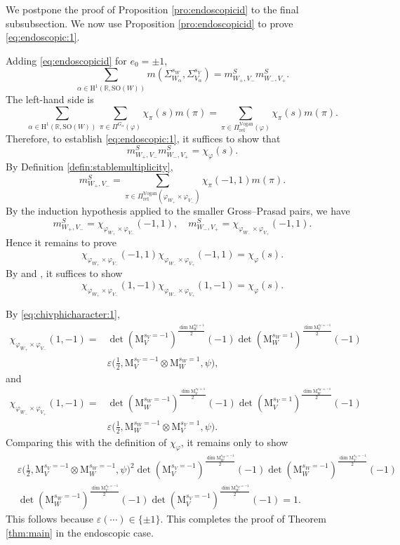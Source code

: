 \documentclass[12pt]{amsart}
\numberwithin{equation}{subsection}
\newcommand{\BR}{{\mathbb {R}}}
\newcommand{\RH}{{\mathrm {H}}}
\newcommand{\RM}{{\mathrm {M}}}
\newcommand{\SO}{{\mathrm{SO}}}
\def\alp{{\alpha}}
\def\veps{{\varepsilon}}
\def\Sig{{\Sigma}}
\def\vphi{\varphi}
\def\Vg{\mathrm{Vogan}}
\def\rel{\mathrm{rel}}
\def\SO{\mathrm{SO}}
\begin{document}
We postpone the proof of Proposition \ref{pro:endoscopicid} to the final subsubsection. We now use Proposition \ref{pro:endoscopicid} to prove \eqref{eq:endoscopic:1}.

Adding \eqref{eq:endoscopicid} for $e_0=\pm 1$,
\[
\sum_{\alp\in \RH^1(\BR,\SO(W))}
m(\Sig^{s_W}_{W_\alp},\Sig^{s_V}_{V_\alp}) =
m^S_{W_+,V_-} m^S_{W_-,V_+}.
\]
The left-hand side is
\[
\sum_{\alp\in \RH^1(\BR,\SO(W))}
\sum_{\pi\in \Pi^{G_\alp}(\vphi)}
\chi_\pi(s) m(\pi)
=
\sum_{\pi\in \Pi^\Vg_\rel(\vphi)}
\chi_\pi(s) m(\pi).
\]
Therefore, to establish \eqref{eq:endoscopic:1}, it suffices to show that
\[
m^S_{W_+,V_-} m^S_{W_-,V_+} =
\chi_\vphi(s).
\]
By Definition \ref{defin:stablemultiplicity},
\[
m^S_{W_+,V_-}
=
\sum_{\pi\in \Pi^\Vg_{\rel}(\vphi_{W_+}\times \vphi_{V_-})}
\chi_\pi(-1,1) m(\pi).
\]
By the induction hypothesis applied to the smaller Gross--Prasad pairs, we have
\[
m^S_{W_+,V_-} =
\chi_{\vphi_{W_+}\times \vphi_{V_-}}(-1,1),
\quad
m^S_{W_-,V_+} =
\chi_{\vphi_{W_-}\times \vphi_{V_+}}(-1,1).
\]
Hence it remains to prove
\[
\chi_{\vphi_{W_+}\times \vphi_{V_-}}(-1,1)
\chi_{\vphi_{W_-}\times \vphi_{V_+}}(-1,1)
=
\chi_\vphi(s).
\]
By \cite[(10.4)]{MR1186476} and \cite[Prop.~10.5]{MR1186476}, it suffices to show
\[
\chi_{\vphi_{W_+}\times \vphi_{V_-}}(1,-1)
\chi_{\vphi_{W_-}\times \vphi_{V_+}}(1,-1)
=
\chi_\vphi(s).
\]

By \eqref{eq:chivphicharacter:1},
\begin{align*}
\chi_{\vphi_{W_+}\times \vphi_{V_-}}(1,-1)
= &
\det
({\RM^{s_V=-1}_V})^{\frac{\dim \RM_{W}^{s_W = 1}}{2}}(-1)
\det
({\RM_{W}^{s_W=1}})^{\frac{\dim \RM_V^{s_V=-1}}{2}}(-1)
\\
&
\veps
\big(
\frac{1}{2},
\RM^{s_V=-1}_V\otimes \RM_{W}^{s_W = 1},\psi
\big),
\end{align*}
and
\begin{align*}
\chi_{\vphi_{W_-}\times \vphi_{V_+}}(1,-1)
=
&
\det
({\RM^{s_W=-1}_W})^{\frac{\dim \RM_{V}^{s_V = 1}}{2}}(-1)
\det
({\RM_{V}^{s_V=1}})^{\frac{\dim \RM_W^{s_W=-1}}{2}}(-1)
\\
&
\veps
\big(
\frac{1}{2},
\RM^{s_W=-1}_W\otimes \RM_{V}^{s_V = 1},\psi
\big).
\end{align*}
Comparing this with the definition of $\chi_\vphi$, it remains only to show
\begin{align*}
&\veps
\big(
\frac{1}{2},
\RM^{s_V=-1}_V
\otimes
\RM^{s_W=-1}_W,
\psi
\big)^2
\det({\RM^{s_V=-1}_V})^{\frac{\dim \RM_W^{s_W=-1}}{2}}(-1)
\det({\RM_W^{s_W=-1}})^{\frac{\dim \RM_V^{s_V=-1}}{2}}(-1)
\\
&
\det({\RM_W^{s_W=-1}})^{
\frac{\dim \RM^{s_V=-1}_V}{2}
}(-1)
\det({\RM_V^{s_V=-1}})^{\frac{\dim \RM_W^{s_W=-1}}{2}}(-1)=1.
\end{align*}
This follows because $\veps(\cdots)\in \{\pm 1\}$. This completes the proof of
Theorem \ref{thm:main} in the endoscopic case.
\end{document}
